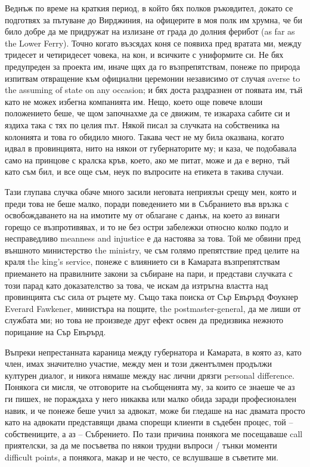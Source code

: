 \documentclass[12pt]{book}
\begin{document}
Веднъж по време на краткия период, в който бях полков ръковдител, докато се подготвях за пътуване до Вирджиния, на офицерите в моя полк им хрумна, че би било добре да ме придружат на излизане от града до долния ферибот (as far as the Lower Ferry). Точно когато възсядах коня се появиха пред вратата ми, между тридесет и четиридесет човека, на кон, и всичките с униформите си. Не бях предупреден за проекта им, иначе щях да го възпрепятствам, понеже по природа изпитвам отвращение към официални церемонии независимо от случая averse to the assuming of state on any occasion; и бях доста раздразнен от появата им, тъй като не можех избегна компанията им. Нещо, което още повече влоши положението беше, че щом започнахме да се движим, те изкараха сабите си и яздиха така с тях по целия път. Някой писал за случката на собственика на колонията и това го обидило много. Такава чест не му била оказвана, когато идвал в провинцията, нито на някои от губернаторите му; и каза, че подобавала само на принцове с кралска кръв, което, ако ме питат, може и да е верно, тъй като съм бил, и все още съм, неук по въпросите на етикета в такива случаи. 

Тази глупава случка обаче много засили неговата неприязън срещу мен, която и преди това не беше малко, поради поведението ми в Събранието във връзка с освобождаването на на имотите му от облагане с данък, на което аз винаги горещо се възпротивявах, и то не без остри забележки относно колко подло и несправедливо meanness and injustice е да настоява за това. Той ме обвини пред външното министерство the ministry, че съм голямо препятствие пред целите на краля the king's service, понеже с влиянието си в Камарата възпрепятствам приемането на правилните закони за събиране на пари, и представи случката с този парад като доказателство за това, че искам да изтръгна властта над провинцията със сила от ръцете му. Също така поиска от Сър Евърърд Фоукнер Everard Fawkener, министъра на пощите, the postmaster-general, да ме лиши от службата ми; но това не произведе друг ефект освен да предизвика нежното порицание на Сър Евърърд. 

Въпреки непрестанната караница между губернатора и Камарата, в която аз, като член, имах значително участие, между мен и този джентълмен продължи културен диалог, и никога нямаше между нас лични дрязги personal difference. Понякога си мисля, че отговорите на съобщенията му, за които се знаеше че аз ги пишех, не пораждаха у него никаква или малко обида заради професионален навик, и че понеже беше учил за адвокат, може би гледаше на нас двамата просто като на адвокати представящи двама спорещи клиенти в съдебен процес, той – собствениците, а аз – Събрението. По тази причина понякога ме посещаваше call приятелски, за да ме посъветва по някои трудни въпроси / тънки моменти difficult points, а понякога, макар и не често, се вслушваше в съветите ми.
\end{document}
